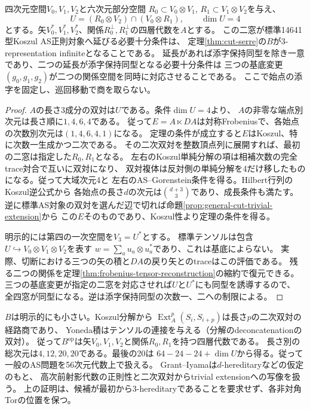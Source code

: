\begin{corollary}[二窓からの延長と添字保持同型]\label{cor:two-window-extension}
四次元空間$V_0,V_1,V_2$と六次元部分空間
$R_0\subset V_0\otimes V_1$, $R_1\subset V_1\otimes V_2$を与え、
\[
 U=(R_0\otimes V_2)\cap(V_0\otimes R_1),\qquad \dim U=4
\]
とする。矢$V_0^*,V_1^*,V_2^*$、関係$R_0^\perp,R_1^\perp$の四層代数を$A$とする。
この二窓が標準14641型Koszul AS正則対象へ延びる必要十分条件は、
定理\ref{thm:cut-serre}の$B$が3-representation infiniteとなることである。
延長があれば添字保持同型を除き一意であり、二つの延長が添字保持同型となる必要十分条件は
三つの基底変更$(g_0,g_1,g_2)$が二つの関係空間を同時に対応させることである。
ここで始点の添字を固定し、巡回移動で商を取らない。
\end{corollary}
\begin{proof}
$A$の長さ3成分の双対は$U$である。条件$\dim U=4$より、
$A$の非零な端点別次元は長さ順に$1,4,6,4$である。
従って$E=A\ltimes DA$は対称Frobeniusで、各始点の次数別次元は$(1,4,6,4,1)$になる。
定理の条件が成立すると$E$はKoszul、特に次数一生成かつ二次である。
その二次双対を整数頂点列に展開すれば、最初の二窓は指定した$R_0,R_1$となる。
左右のKoszul単純分解の項は相補次数の完全trace対合で互いに双対になり、
双対複体は反対側の単純分解を4だけ移したものになる。従って大域次元4と
左右のAS--Gorenstein条件を得る。Hilbert行列のKoszul逆公式から
各始点の長さ$d$の次元は$\binom{d+3}{3}$であり、成長条件も満たす。
逆に標準AS対象の双対を選んだ辺で切れば命題\ref{prop:general-cut-trivial-extension}から
この$E$そのものであり、Koszul性より定理の条件を得る。

明示的には第四の一次空間を$V_3=U^*$とする。
標準テンソルは包含$U\hookrightarrow V_0\otimes V_1\otimes V_2$を表す
$w=\sum_a u_a\otimes u_a^*$であり、これは基底によらない。
実際、切断における三つの矢の積と$DA$の戻り矢とのtraceはこの評価である。
残る二つの関係を定理\ref{thm:frobenius-tensor-reconstruction}の縮約で復元できる。
三つの基底変更が指定の二窓を対応させれば$U$と$U^*$にも同型を誘導するので、
全四窓が同型になる。逆は添字保持同型の次数一、二への制限による。
\end{proof}

$B$は明示的にも小さい。Koszul分解から
$\operatorname{Ext}_A^p(S_i,S_{i+p})$は長さ$p$の二次双対の経路商であり、
Yoneda積はテンソルの連接を与える（分解のdeconcatenationの双対）。
従って$B^{\mathrm{op}}$は矢$V_0,V_1,V_2$と関係$R_0,R_1$を持つ四層代数である。
長さ別の総次元は$4,12,20,20$である。最後の20は
$64-24-24+\dim U$から得る。従って一般のAS問題を56次元代数上で扱える。
Grant--Iyama\cite[Theorems B, C]{GrantIyama}は$d$-hereditaryなどの仮定のもと、
高次前射影代数の正則性と二次双対からtrivial extensionへの写像を扱う。
上の証明は、候補が最初から3-hereditaryであることを要求せず、各非対角Torの位置を保つ。
